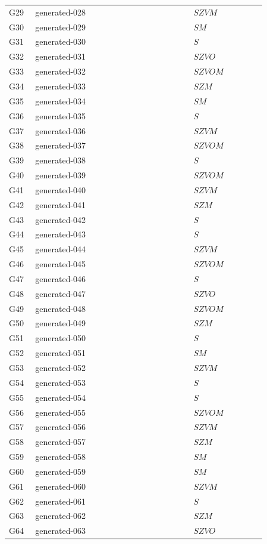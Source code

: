 \begin{longtable}{@{}p{0.09\linewidth}p{0.54\linewidth}p{0.25\linewidth}@{}}
G29 & generated-028 & $SZVM$\\
G30 & generated-029 & $SM$\\
G31 & generated-030 & $S$\\
G32 & generated-031 & $SZVO$\\
G33 & generated-032 & $SZVOM$\\
G34 & generated-033 & $SZM$\\
G35 & generated-034 & $SM$\\
G36 & generated-035 & $S$\\
G37 & generated-036 & $SZVM$\\
G38 & generated-037 & $SZVOM$\\
G39 & generated-038 & $S$\\
G40 & generated-039 & $SZVOM$\\
G41 & generated-040 & $SZVM$\\
G42 & generated-041 & $SZM$\\
G43 & generated-042 & $S$\\
G44 & generated-043 & $S$\\
G45 & generated-044 & $SZVM$\\
G46 & generated-045 & $SZVOM$\\
G47 & generated-046 & $S$\\
G48 & generated-047 & $SZVO$\\
G49 & generated-048 & $SZVOM$\\
G50 & generated-049 & $SZM$\\
G51 & generated-050 & $S$\\
G52 & generated-051 & $SM$\\
G53 & generated-052 & $SZVM$\\
G54 & generated-053 & $S$\\
G55 & generated-054 & $S$\\
G56 & generated-055 & $SZVOM$\\
G57 & generated-056 & $SZVM$\\
G58 & generated-057 & $SZM$\\
G59 & generated-058 & $SM$\\
G60 & generated-059 & $SM$\\
G61 & generated-060 & $SZVM$\\
G62 & generated-061 & $S$\\
G63 & generated-062 & $SZM$\\
G64 & generated-063 & $SZVO$\\
\end{longtable}
